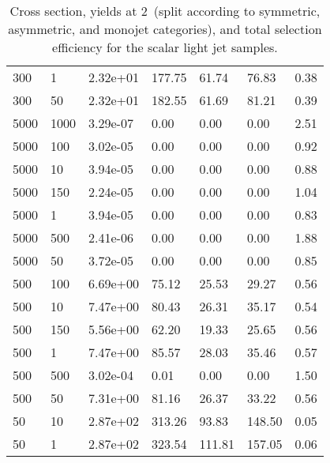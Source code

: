 \begin{table}
\begin{tabular}{lllllll}
300       &   1         &   2.32e+01  &   177.75    &   61.74     &   76.83     &   0.38      \\ 
300       &   50        &   2.32e+01  &   182.55    &   61.69     &   81.21     &   0.39      \\ 
5000      &   1000      &   3.29e-07  &   0.00      &   0.00      &   0.00      &   2.51      \\ 
5000      &   100       &   3.02e-05  &   0.00      &   0.00      &   0.00      &   0.92      \\ 
5000      &   10        &   3.94e-05  &   0.00      &   0.00      &   0.00      &   0.88      \\ 
5000      &   150       &   2.24e-05  &   0.00      &   0.00      &   0.00      &   1.04      \\ 
5000      &   1         &   3.94e-05  &   0.00      &   0.00      &   0.00      &   0.83      \\ 
5000      &   500       &   2.41e-06  &   0.00      &   0.00      &   0.00      &   1.88      \\ 
5000      &   50        &   3.72e-05  &   0.00      &   0.00      &   0.00      &   0.85      \\ 
500       &   100       &   6.69e+00  &   75.12     &   25.53     &   29.27     &   0.56      \\ 
500       &   10        &   7.47e+00  &   80.43     &   26.31     &   35.17     &   0.54      \\ 
500       &   150       &   5.56e+00  &   62.20     &   19.33     &   25.65     &   0.56      \\ 
500       &   1         &   7.47e+00  &   85.57     &   28.03     &   35.46     &   0.57      \\ 
500       &   500       &   3.02e-04  &   0.01      &   0.00      &   0.00      &   1.50      \\ 
500       &   50        &   7.31e+00  &   81.16     &   26.37     &   33.22     &   0.56      \\ 
50        &   10        &   2.87e+02  &   313.26    &   93.83     &   148.50    &   0.05      \\ 
50        &   1         &   2.87e+02  &   323.54    &   111.81    &   157.05    &   0.06      \\ 
\hline
\end{tabular}
\caption{Cross section, yields at 2~\ifb (split according to symmetric, asymmetric, and monojet categories), and total selection efficiency for the scalar light jet samples.}
\label{tab:dm_S_g1_2fb}
\end{table}
